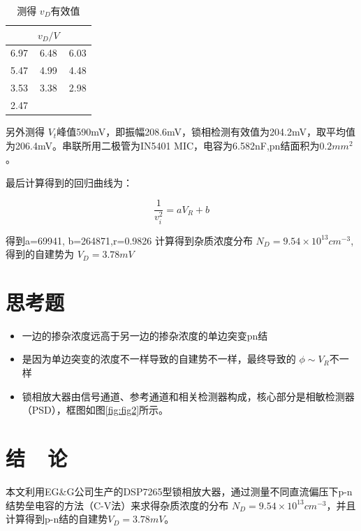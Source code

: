 \documentclass{buaaemp}
\begin{document}
\begin{table}[h]
\centering
\captionnamefont{\wuhao\bf\heiti}
\captiontitlefont{\wuhao\bf\heiti}
\caption{测得 $v_D$有效值} \label{tab:eg2}
\liuhao
\begin{tabular}{ccc}
\toprule
  &$v_D /V$ &  \space \\
\midrule 
6.97 & 6.48 &6.03\\
5.47 &4.99 &4.48 \\
 3.53 & 3.38 &2.98\\
 2.47 & & \\
\bottomrule
\end{tabular}
\end{table}

另外测得 $V_t$峰值590mV，即振幅208.6mV，锁相检测有效值为204.2mV，取平均值为206.4mV。串联所用二极管为IN5401 MIC，电容为6.582nF,pn结面积为$0.2mm^2$。

最后计算得到的回归曲线为：

\begin{equation}
    \frac{1}{v_i^2}=aV_R+b
\end{equation}

得到a=69941, b=264871,r=0.9826
计算得到杂质浓度分布 $N_D=9.54\times 10^{13} cm^{-3} $,得到的自建势为 $V_D=3.78mV$
\section{思考题}
\begin{itemize}
    \item 一边的掺杂浓度远高于另一边的掺杂浓度的单边突变pn结
    \item 是因为单边突变的浓度不一样导致的自建势不一样，最终导致的 $\phi \sim V_R$不一样
    \item 锁相放大器由信号通道、参考通道和相关检测器构成，核心部分是相敏检测器（PSD），框图如图\ref{fig:fig2}所示。
\end{itemize}
\section{结~~论}
本文利用EG&G公司生产的DSP7265型锁相放大器，通过测量不同直流偏压下p-n结势垒电容的方法（C-V法）来求得杂质浓度的分布 $N_D=9.54\times 10^{13} cm^{-3} $，并且计算得到p-n结的自建势$V_D=3.78mV$。



\renewcommand\refname{\heiti\wuhao\centerline{参考文献}\global\def\refname{参考文献}}
\vskip 12pt

\let\OLDthebibliography\thebibliography
\renewcommand\thebibliography[1]{
  \OLDthebibliography{#1}
  \setlength{\parskip}{0pt}
  \setlength{\itemsep}{0pt plus 0.3ex}
}

{
\renewcommand{\baselinestretch}{0.9}
\liuhao


}
\end{document}
